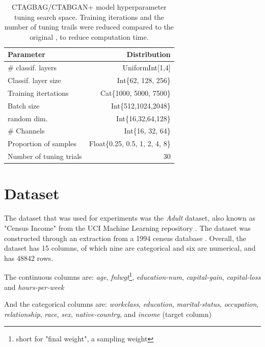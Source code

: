 \begin{table}[h]
	\centering
	\begin{tabular}{lr}
		\toprule
		Parameter               & Distribution                   \\
		\midrule
		\# classif. layers      & UniformInt[1,4]                \\
		Classif. layer size     & Int\{62, 128, 256\}            \\
		Training itertations    & Cat\{1000, 5000, 7500\}        \\
		Batch size              & Int\{512,1024,2048\}           \\
		random dim.             & Int\{16,32,64,128\}            \\
		\# Channels             & Int\{16, 32, 64\}              \\
		Proportion of samples   & Float\{0.25, 0.5, 1, 2, 4, 8\} \\
		\midrule
		Number of tuning trials & 30                             \\
		\bottomrule
	\end{tabular}
	\caption[CTAGBAG(+) Hyperparameter Search Space]{CTAGBAG/CTABGAN+ model hyperparameter tuning search space. Training iterations and the number of tuning trails were reduced compared to the original \cite{kotelnikov2022TabDDPMModellingTabular}, to reduce computation time.}
	\label{tab:ctabgan_tune}
\end{table}

\section{Dataset}
\label{ch:methods-datasets}

The dataset that was used for experiments was the \textit{Adult} dataset, also known as "Census Income" from the UCI Machine Learning repository \cite{Dua:2019}.
The dataset was constructed through an extraction from a 1994 census database \cite{kohavi1996ScalingAccuracyNaiveBayes}.
Overall, the dataset has 15 columns, of which nine are categorical and six are numerical, and has 48842 rows.

The continuous columns are: \textit{age}, \textit{fnlwgt}\footnote{short for "final weight", a sampling weight}, \textit{education-num}, \textit{capital-gain}, \textit{capital-loss} and \textit{hours-per-week}


And the categorical columns are: \textit{workclass}, \textit{education}, \textit{marital-status}, \textit{occupation}, \textit{relationship}, \textit{race}, \textit{sex}, \textit{native-country}, and \textit{income} (target column)



